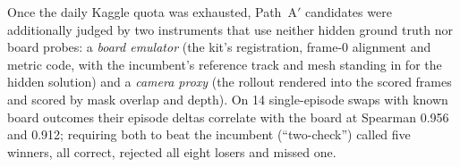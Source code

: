 
Once the daily Kaggle quota was exhausted, Path~A$'$ candidates were additionally judged by two
instruments that use neither hidden ground truth nor board probes: a \emph{board emulator} (the
kit's registration, frame-0 alignment and metric code, with the incumbent's reference track and
mesh standing in for the hidden solution) and a \emph{camera proxy} (the rollout rendered into
the scored frames and scored by mask overlap and depth). On 14 single-episode swaps with known
board outcomes their episode deltas correlate with the board at Spearman 0.956 and 0.912;
requiring both to beat the incumbent (``two-check'') called five winners, all correct, rejected
all eight losers and missed one.
